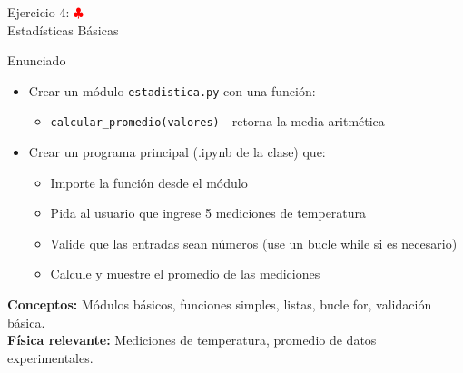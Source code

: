 \documentclass[10pt]{beamer}
\begin{document}
\begin{frame}{Ejercicio 4: \hfill \textcolor{red}{$\clubsuit$} \\ Estadísticas Básicas}
  \begin{block}{Enunciado}
    \begin{itemize}
      \item Crear un módulo \texttt{estadistica.py} con una función:
        \begin{itemize}
          \item \texttt{calcular\_promedio(valores)} - retorna la media aritmética
        \end{itemize}
      \item Crear un programa principal (.ipynb de la clase) que:
        \begin{itemize}
          \item Importe la función desde el módulo
          \item Pida al usuario que ingrese 5 mediciones de temperatura
          \item Valide que las entradas sean números (use un bucle while si es necesario)
          \item Calcule y muestre el promedio de las mediciones
        \end{itemize}
    \end{itemize}
  \end{block}
  
  \textbf{Conceptos:} Módulos básicos, funciones simples, listas, bucle for, validación básica.\\
  \textbf{Física relevante:} Mediciones de temperatura, promedio de datos experimentales.
\end{frame}
\end{document}
